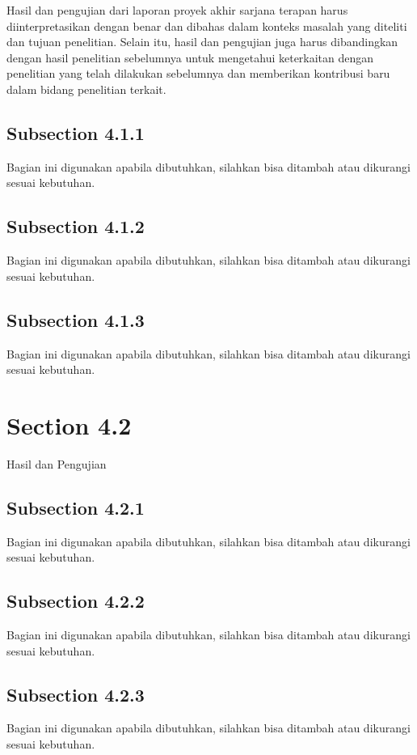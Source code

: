Hasil dan pengujian dari laporan proyek akhir sarjana terapan harus diinterpretasikan dengan benar dan dibahas dalam konteks masalah yang diteliti dan tujuan penelitian. Selain itu, hasil dan pengujian juga harus dibandingkan dengan hasil penelitian sebelumnya untuk mengetahui keterkaitan dengan penelitian yang telah dilakukan sebelumnya dan memberikan kontribusi baru dalam bidang penelitian terkait.

\subsection{Subsection 4.1.1}
Bagian ini digunakan apabila dibutuhkan, silahkan bisa ditambah atau dikurangi sesuai kebutuhan.

\subsection{Subsection 4.1.2}
Bagian ini digunakan apabila dibutuhkan, silahkan bisa ditambah atau dikurangi sesuai kebutuhan.

\subsection{Subsection 4.1.3}
Bagian ini digunakan apabila dibutuhkan, silahkan bisa ditambah atau dikurangi sesuai kebutuhan.

\section{Section 4.2}
\noindent Hasil dan Pengujian

\subsection{Subsection 4.2.1}
Bagian ini digunakan apabila dibutuhkan, silahkan bisa ditambah atau dikurangi sesuai kebutuhan.

\subsection{Subsection 4.2.2}
Bagian ini digunakan apabila dibutuhkan, silahkan bisa ditambah atau dikurangi sesuai kebutuhan.

\subsection{Subsection 4.2.3}
Bagian ini digunakan apabila dibutuhkan, silahkan bisa ditambah atau dikurangi sesuai kebutuhan.


